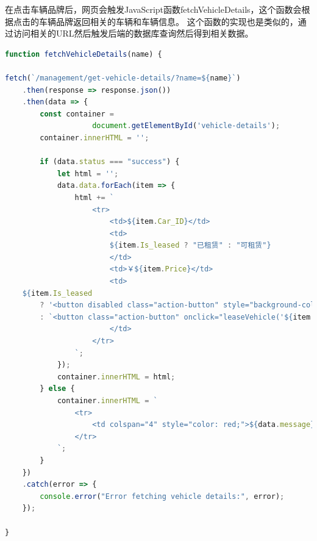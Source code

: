 \documentclass[UTF8,a4paper,12pt]{ctexart}
\begin{document}
在点击车辆品牌后，网页会触发JavaScript函数fetchVehicleDetails，这个函数会根据点击的车辆品牌返回相关的车辆和车辆信息。
这个函数的实现也是类似的，通过访问相关的URL然后触发后端的数据库查询然后得到相关数据。
\begin{lstlisting}[language=JavaScript]
function fetchVehicleDetails(name) {

fetch(`/management/get-vehicle-details/?name=${name}`)
    .then(response => response.json())
    .then(data => {
        const container = 
                    document.getElementById('vehicle-details');
        container.innerHTML = ''; 

        if (data.status === "success") {
            let html = '';
            data.data.forEach(item => {
                html += `
                    <tr>
                        <td>${item.Car_ID}</td>
                        <td>
                        ${item.Is_leased ? "已租赁" : "可租赁"}
                        </td>
                        <td>￥${item.Price}</td>
                        <td>
    ${item.Is_leased
        ? '<button disabled class="action-button" style="background-color: gray; cursor: not-allowed;">已租赁</button>'
        : `<button class="action-button" onclick="leaseVehicle('${item.Car_ID}', '${name}')">租赁</button>`}
                        </td>
                    </tr>
                `;
            });
            container.innerHTML = html;
        } else {
            container.innerHTML = `
                <tr>
                    <td colspan="4" style="color: red;">${data.message}</td>
                </tr>
            `;
        }
    })
    .catch(error => {
        console.error("Error fetching vehicle details:", error);
    });

}
\end{lstlisting}
\end{document}
